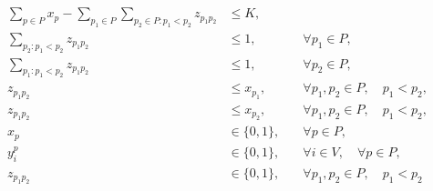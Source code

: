 \begin{spreadlines}{14pt}
\begin{align}
        \label{eq7}                                                                                                                                                                    \\
        \sum_{p \in P} x_p - \sum_{p_1 \in P} \sum_{p_2 \in P : p_1 < p_2} z_{{p_1}{p_2}} & \leq K,
        \label{eq8}                                                                                                                                                                    \\
        \sum_{p_2 : p_1 < p_2} z_{{p_1}{p_2}}                                             & \leq 1,                                 & \quad \forall p_1 \in P,
        \label{eq9}                                                                                                                                                                    \\
        \sum_{p_1 : p_1 < p_2} z_{{p_1}{p_2}}                                             & \leq 1,                                 & \quad \forall p_2 \in P,
        \label{eq10}                                                                                                                                                                   \\
        z_{{p_1}{p_2}}                                                                    & \leq x_{p_1},                           & \quad \forall p_1, p_2 \in P, \quad p_1 < p_2,
        \label{eq11}                                                                                                                                                                   \\
        z_{{p_1}{p_2}}                                                                    & \leq x_{p_2},                           & \quad \forall p_1, p_2 \in P, \quad p_1 < p_2,
        \label{eq12}                                                                                                                                                                   \\
        x_p                                                                               & \in \{0,1\},                            & \quad \forall p \in P,
        \label{eq13}                                                                                                                                                                   \\
        y^p_i                                                                             & \in \{0,1\},                            & \quad \forall i \in V, \quad \forall p \in P,
        \label{eq14}                                                                                                                                                                   \\
        z_{{p_1}{p_2}}                                                                    & \in \{0,1\},                            & \quad \forall p_1, p_2 \in P,  \quad p_1 < p_2
        \label{eq15}
    \end{align}
\end{spreadlines}

